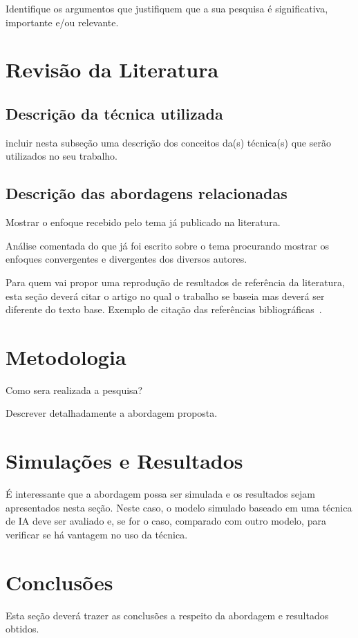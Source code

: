 \documentclass[english]{article}
\begin{document}
Identifique os argumentos que justifiquem que a sua pesquisa é
significativa, importante e/ou relevante. %

\section{Revisão da Literatura}
\subsection{Descrição da técnica utilizada}
incluir nesta subseção uma descrição dos conceitos da(s) técnica(s)
que serão utilizados no seu trabalho.

\subsection{Descrição das abordagens relacionadas}
\vspace{1cm} Mostrar o enfoque recebido pelo tema já publicado na
literatura. \vspace{1cm}

Análise comentada do que já foi escrito sobre o tema procurando
mostrar os enfoques convergentes e divergentes dos diversos
autores. \vspace{1cm}

Para quem vai propor uma reprodução de resultados de referência da literatura, esta
seção deverá citar o artigo no qual o trabalho se baseia mas deverá ser diferente
do texto base.
Exemplo de citação das referências
bibliográficas~\cite{Russell:2003,Pedrycz:2007,haykin2001redes,Braga:2007}.
\vspace{2cm}
\section{Metodologia}
\vspace{1cm} Como sera realizada a pesquisa? \vspace{1cm}

Descrever detalhadamente a abordagem proposta. \vspace{2cm}
\section{Simulações e Resultados}
\vspace{1cm} É interessante que a abordagem possa ser simulada e
os resultados sejam apresentados nesta seção. Neste caso, o modelo
simulado baseado em uma técnica de IA deve ser avaliado e, se for o caso,
comparado com outro modelo, para verificar se há vantagem no uso
da técnica. \vspace{2cm}
\section{Conclusões}
\vspace{1cm} Esta seção deverá trazer as conclusões a respeito da
abordagem e resultados obtidos. \vspace{2cm}



\end{document}
